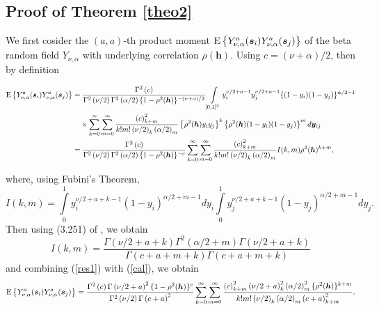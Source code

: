 \documentclass[times,sort&compress,3p]{elsarticle}
\theoremstyle{plain}%
\theoremstyle{definition}
\def\ss{\bm{s}}
\def\EE{{\rm E}}
\def\hh{\bm{h}}
\def\yy{\bm{y}}
\begin{document}
\subsection*{Proof of Theorem \ref{theo2}}\label{proof_theo2}
\noindent We first cosider the $(a,a)$-th product moment $\EE\left\{Y_{\nu,\alpha}^a(\ss_i)Y_{\nu,\alpha}^a(\ss_j)\right\}$ of the beta random field $Y_{\nu,\alpha}$ with underlying correlation $\rho(\hh)$. Using $c=(\nu+\alpha)/2$, then by definition
\begin{small}
\begin{align}\label{cal}
\EE\left\{Y_{\nu,\alpha}^a(\ss_i)Y_{\nu,\alpha}^a(\ss_j)\right\}
&=\frac{\Gamma^2\left(c\right)}{\Gamma^2\left(\nu/2\right)\Gamma^2\left(\alpha/2\right)\{1-\rho^2(\hh)\}^{-(\nu+\alpha)/2}}
\int\limits_{[0,1]^2}y_i^{\nu/2+a-1}y_j^{\nu/2+a-1}\{(1-y_i)(1-y_j)\}^{\alpha/2-1}\nonumber\\
&\quad\times \sum\limits_{k=0}^{\infty}\sum\limits_{m=0}^{\infty}\frac{\left(c\right)_{k+m}^2}{k!m!\left(\nu/2\right)_k\left(\alpha/2\right)_m}
\left\{\rho^2(\hh)y_iy_j\right\}^k\left\{\rho^2(\hh)(1-y_i)(1-y_j)\right\}^m d\yy_{ij}\nonumber\\
&=\frac{\Gamma^2\left(c\right)}{\Gamma^2\left(\nu/2\right)\Gamma^2\left(\alpha/2\right)\{1-\rho^2(\hh)\}^{-c}}
\sum\limits_{k=0}^{\infty}\sum\limits_{m=0}^{\infty}\frac{\left(c\right)_{k+m}^2}{k!m!\left(\nu/2\right)_k\left(\alpha/2\right)_m}I(k,m)\rho^{2}(\hh)^{k+m},
\end{align}
\end{small}
where, using Fubini's Theorem,
\begin{equation*}
I(k,m)=\int\limits_0^1y_i^{\nu/2+a+k-1}(1-y_i)^{\alpha/2+m-1}dy_i
\int\limits_0^1y_j^{\nu/2+a+k-1}(1-y_j)^{\alpha/2+m-1}dy_j.
\end{equation*}
Then using (3.251) of \cite{Gradshteyn:Ryzhik:2007}, we obtain
\begin{equation}\label{res1}
I(k,m)=\dfrac{\Gamma\left(\nu/2+a+k\right)\Gamma^2\left(\alpha/2+m\right)\Gamma\left(\nu/2+a+k\right)}
{\Gamma\left(c+a+m+k\right)\Gamma\left(c+a+m+k\right)}
\end{equation}
and combining (\ref{res1}) with (\ref{cal}), we obtain
\begin{equation*}
\EE\left\{Y_{\nu,\alpha}^a(\ss_i)Y_{\nu,\alpha}^a(\ss_j)\right\}
=\frac{\Gamma^2\left(c\right)\Gamma\left(\nu/2+a\right)^2 \{1-\rho^2(\hh)\}^{c}}
{\Gamma^2\left(\nu/2\right)\Gamma\left(c+a\right)^2}
\sum\limits_{k=0}^{\infty}\sum\limits_{m=0}^{\infty}\frac{\left(c\right)_{k+m}^2\left(\nu/2+a\right)^2_k \left(\alpha/2\right)_m^2\{\rho^{2}(\hh)\}^{k+m}}{k!m!\left(\nu/2\right)_k\left(\alpha/2\right)_m\left(c+a\right)^2_{k+m}}.\nonumber
\end{equation*}
\end{document}
